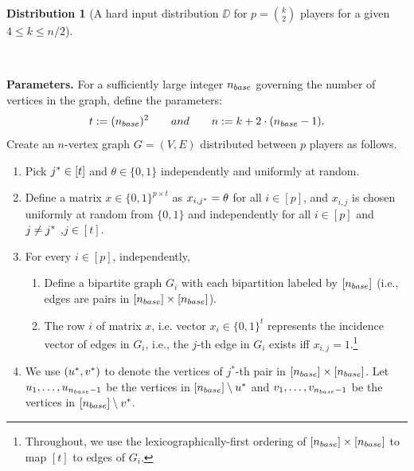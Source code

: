 \documentclass[11pt]{article}
\theoremstyle{definition}
\newenvironment{ourbox}{\begin{mdframed}[hidealllines=false,innerleftmargin=10pt,backgroundcolor=white!10,innertopmargin=5pt,innerbottommargin=5pt,roundcorner=10pt]}{\end{mdframed}}
\newtheorem{mddistribution}{Distribution}
\newenvironment{Distribution}{\begin{ourbox}\begin{mddistribution}}{\end{mddistribution}\end{ourbox}}
\renewcommand{\leq}{\leqslant}
\begin{document}
\begin{Distribution}[A hard input distribution $\DD$ for $p=\binom{k}{2}$ players for a given $4 \leq k \leq n/2$]\label{dist:sim}

~

\smallskip

\noindent
\textbf{Parameters.} 
For a sufficiently large integer $n_{base}$ governing the number of vertices in the graph, define the parameters: 
\[
	t := ({n_{base}})^2 \qquad and \qquad n := k + 2 \cdot (n_{base}-1). 
\]
Create an $n$-vertex graph $G=(V,E)$ distributed between $p$ players as follows. 
\begin{enumerate}
    \item Pick $j^* \in [t]$ and $\theta \in \{0, 1\}$ independently and uniformly at random.
    \item Define a matrix $x \in \{0,1\}^{p \times t}$ as $x_{i,j^*} = \theta$ for all $i \in [p]$, and $x_{i, j} $ is chosen uniformly at random from $\{0,1\}$ and independently for all $i \in [p]$ and $j \neq j^*$ ,$j \in [t]$.  
    \item For every $i \in [p]$, independently, 
    \begin{enumerate}
        \item Define a bipartite graph $G_i$ with each bipartition labeled by $[n_{base}]$ (i.e., edges are pairs in $[n_{base}] \times [n_{base}]$).  
        \item 
        The row $i$ of matrix $x$, i.e. vector $x_i \in \{0,1\}^{t}$ represents the incidence vector of edges in $G_i$, i.e., the $j$-th edge in $G_i$ exists iff $x_{i,j} = 1$.\footnote{Throughout, we use the lexicographically-first ordering
        of $[n_{base}] \times [n_{base}]$ to map $[t]$ to edges of $G_i$.} 
    \end{enumerate}
            
     \item We use $(u^*,v^*)$ to denote the vertices of $j^*$-th pair in $[n_{base}] \times [n_{base}]$. Let $u_1,\ldots,u_{n_{base}-1}$ be the vertices in $[n_{base}] \setminus u^*$ and 
        $v_1,\ldots,v_{n_{base}-1}$ be the vertices in $[n_{base}] \setminus v^*$. 
        

\end{enumerate}
\end{Distribution}
\end{document}
